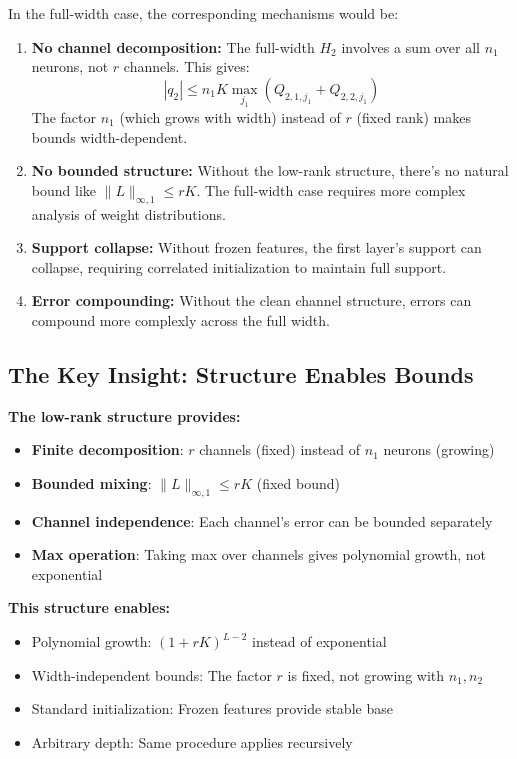 In the full-width case, the corresponding mechanisms would be:

\begin{enumerate}
\item \textbf{No channel decomposition:} The full-width $H_2$ involves a sum over all $n_1$ neurons, not $r$ channels. This gives:
   \[
   |q_2| \le n_1 K \max_{j_1}(Q_{2,1,j_1} + Q_{2,2,j_1})
   \]
   The factor $n_1$ (which grows with width) instead of $r$ (fixed rank) makes bounds width-dependent.

\item \textbf{No bounded structure:} Without the low-rank structure, there's no natural bound like $\|L\|_{\infty,1} \le rK$. The full-width case requires more complex analysis of weight distributions.

\item \textbf{Support collapse:} Without frozen features, the first layer's support can collapse, requiring correlated initialization to maintain full support.

\item \textbf{Error compounding:} Without the clean channel structure, errors can compound more complexly across the full width.
\end{enumerate}

\subsection{The Key Insight: Structure Enables Bounds}

\textbf{The low-rank structure provides:}
\begin{itemize}
\item \textbf{Finite decomposition}: $r$ channels (fixed) instead of $n_1$ neurons (growing)
\item \textbf{Bounded mixing}: $\|L\|_{\infty,1} \le rK$ (fixed bound)
\item \textbf{Channel independence}: Each channel's error can be bounded separately
\item \textbf{Max operation}: Taking max over channels gives polynomial growth, not exponential
\end{itemize}

\textbf{This structure enables:}
\begin{itemize}
\item Polynomial growth: $(1+rK)^{L-2}$ instead of exponential
\item Width-independent bounds: The factor $r$ is fixed, not growing with $n_1, n_2$
\item Standard initialization: Frozen features provide stable base
\item Arbitrary depth: Same procedure applies recursively
\end{itemize}

